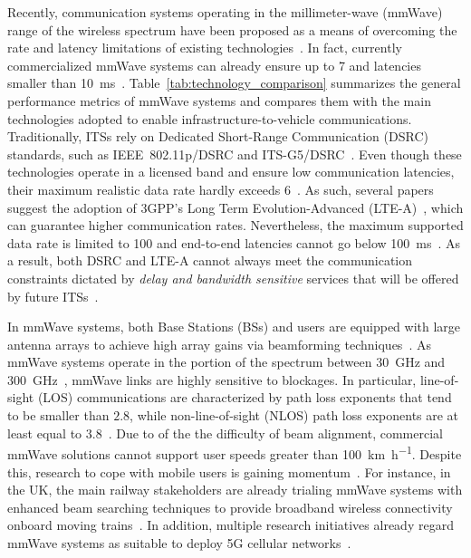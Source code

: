 \documentclass[10pt,journal,a4paper]{IEEEtran}
\begin{document}
Recently, communication systems operating in the millimeter-wave (mmWave) range of the wireless spectrum have been proposed as a means of overcoming the rate and latency limitations of existing technologies~\cite{RR0,RR1}. In fact, currently commercialized mmWave systems can already ensure up to \SI{7}{\Gbps} and latencies smaller than \SI{10}{\milli\second}~\cite{C0}. Table~\ref{tab:technology_comparison} summarizes the general performance metrics of mmWave systems and compares them with the main technologies adopted to enable infrastructure-to-vehicle communications. Traditionally, ITSs rely on Dedicated Short-Range Communication (DSRC) standards, such as \mbox{IEEE 802.11p/DSRC} and ITS-G5/DSRC~\cite{R0,R3,R4,5771027}. Even though these technologies operate in a licensed band and ensure low communication latencies, their maximum realistic data rate hardly exceeds \SI{6}{\Mbps}~\cite{R0}. As such, several papers~\cite{7390802,6515060} suggest the adoption of 3GPP's Long Term Evolution-Advanced (LTE-A)~\cite{7849790,7335581}, which can guarantee higher communication rates. Nevertheless, the maximum supported data rate is limited to \SI{100}{\Mbps} and end-to-end latencies cannot go below \SI{100}{\milli\second}~\cite{R2}. {As a result, both DSRC and LTE-A cannot always meet the communication constraints dictated by \emph{delay and bandwidth sensitive} services that will be offered by future ITSs~\cite[Table~1]{5G-PPP}}.

In mmWave systems, both Base Stations (BSs) and users are equipped with large antenna arrays to achieve high array gains via beamforming techniques~\cite{rappaport2014millimeter}. As mmWave systems operate in the portion of the spectrum between \SI{30}{\giga\hertz} and \SI{300}{\giga\hertz}~\cite{C0}, mmWave links are highly sensitive to blockages. In particular, line-of-sight (LOS) communications are characterized by path loss exponents that tend to be smaller than $2.8$, while non-line-of-sight (NLOS) path loss exponents are at least equal to $3.8$~\cite{6387266}.
Due to of the the difficulty of beam alignment, commercial mmWave solutions cannot support user speeds greater than \SI{100}{\kilo\meter\per\hour}.
Despite this, research to cope with mobile users is gaining momentum~\cite{7156092}. For instance, in the UK, the main railway stakeholders are already trialing mmWave systems with enhanced beam searching techniques to provide broadband wireless connectivity onboard moving trains~\cite{mantra}. In addition, multiple research initiatives already regard mmWave systems as suitable to deploy 5G cellular networks~\cite{7474037,6932503,6515173}.
\end{document}
